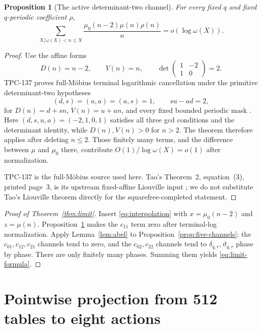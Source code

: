\documentclass[11pt]{article}
\newtheorem{proposition}[theorem]{Proposition}
\theoremstyle{definition}
\theoremstyle{remark}
\newcommand{\mob}{\mu}
\newcommand{\dd}{\delta}
\newcommand{\thh}{\vartheta}
\begin{document}
\begin{proposition}[The active determinant-two channel]
\label{prop:c11}
For every fixed $q$ and fixed $q$-periodic coefficient $\rho$,
\begin{equation}
 \sum_{X/\omega(X)<n\le X}
 \frac{\mob_0(n-2)\mob(n)\rho(n)}n
 =o(\log\omega(X)).
 \label{eq:c11-terminal}
\end{equation}
\end{proposition}

\begin{proof}
Use the affine forms
\[
 D(n)=n-2,
 \qquad V(n)=n,
 \qquad
 \det\begin{pmatrix}1&-2\\1&0\end{pmatrix}=2.
\]
TPC-137 proves full-M\"obius terminal logarithmic cancellation under the
primitive determinant-two hypotheses
\[
 (d,s)=(u,a)=(a,s)=1,
 \qquad su-ad=2,
\]
for $D(n)=d+sn$, $V(n)=u+an$, and every fixed bounded periodic mask
\cite{TPC137}.  Here
$(d,s,u,a)=(-2,1,0,1)$ satisfies all three gcd conditions and the determinant
identity, while $D(n),V(n)>0$ for $n>2$.  The theorem therefore applies
after deleting $n\le2$.  Those finitely many
terms, and the difference between $\mob$ and $\mob_0$ there, contribute
$O(1)/\log\omega(X)=o(1)$ after normalization.

TPC-137 is the full-M\"obius source used here.  Tao's Theorem~2,
equation~(3), printed page~3, is its upstream fixed-affine Liouville input
\cite{Tao2016LogChowla}; we do not substitute Tao's Liouville theorem
directly for the squarefree-completed statement.
\end{proof}

\begin{proof}[Proof of Theorem~\ref{thm:limit}]
Insert \eqref{eq:interpolation} with
$x=\mob_0(n-2)$ and $z=\mob(n)$.  Proposition~\ref{prop:c11} makes the
$c_{11}$ term zero after terminal-log normalization.  Apply
Lemma~\ref{lem:abel} to Proposition~\ref{prop:five-channels}: the
$c_{01},c_{12},c_{21}$ channels tend to zero, and the $c_{02},c_{22}$
channels tend to $\dd_{q,r},\thh_{q,r}$ phase by phase.  There are only
finitely many phases.  Summing them yields \eqref{eq:limit-formula}.
\end{proof}

\section{Pointwise projection from 512 tables to eight actions}
\end{document}
